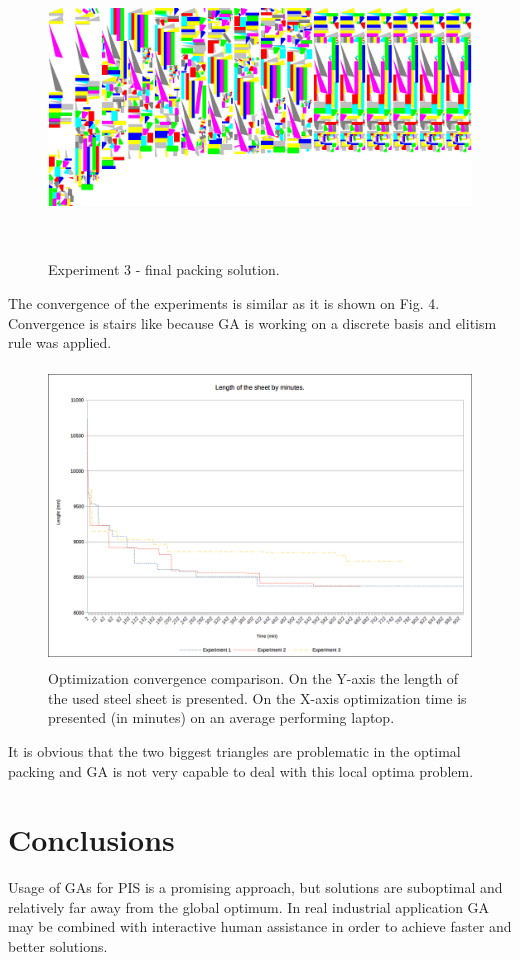 \documentclass{llncs}
\begin{document}
%
\begin{figure}
	\centering
	\includegraphics[width=12.62cm,height=7.88cm]{fig03.png}
	\caption{Experiment 3 - final packing solution.}
	\label{fig:Graph}
\end{figure}
\FloatBarrier

The convergence of the experiments is similar as it is shown on Fig. 4. Convergence is stairs like because GA is working on a discrete basis and elitism rule was applied.

\begin{figure}
	\centering
	\includegraphics[width=12.62cm,height=7.88cm]{fig05.png}
	\caption{Optimization convergence comparison. On the Y-axis the length of the used steel sheet is presented. On the X-axis optimization time is presented (in minutes) on an average performing laptop.}
	\label{fig:Graph}
\end{figure}
\FloatBarrier
%
It is obvious that the two biggest triangles are problematic in the optimal packing and GA is not very capable to deal with this local optima problem.
%
\section{Conclusions}
%
Usage of GAs for PIS is a promising approach, but solutions are suboptimal and relatively far away from the global optimum. In real industrial application GA may be combined with interactive human assistance in order to achieve faster and better solutions. 
%
\end{document}
